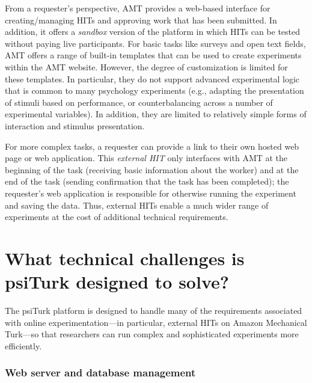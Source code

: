 \documentclass[twocolumn]{svjour3}          %
\newcommand{\psiturk}[0]{\textsf{psiTurk}}
\begin{document}
From a requester's perspective, AMT provides a web-based interface for creating/managing 
HITs and approving work that has been submitted.  In addition, it offers a \emph{sandbox} version 
of the platform in which HITs can be tested without paying live participants.
For basic tasks like surveys and open text fields, AMT offers a range of built-in templates that 
can be used to create experiments within the AMT website.  However, the degree of customization 
is limited for these templates. In particular, they do not support advanced experimental logic that is 
common to many psychology experiments (e.g., adapting the presentation of stimuli based on 
performance, or counterbalancing across a number of experimental variables).
In addition, they are limited to relatively simple forms of interaction and stimulus presentation.

For more complex tasks, a requester can provide a link to their own hosted web page or
web application. This \emph{external HIT} only interfaces with AMT at the beginning of the task (receiving 
basic information about the worker) and at the end of the task (sending confirmation that the task 
has been completed); the requester's web application is responsible for otherwise running the 
experiment and saving the data.  Thus, external HITs enable a much wider range of experiments at 
the cost of additional technical requirements.



\section{What technical challenges is \psiturk{} designed to solve?}

The \psiturk{} platform is designed to handle many of the requirements associated with online experimentation---in particular, external HITs on Amazon Mechanical Turk---so that researchers can run complex and sophisticated experiments more efficiently.

\subsubsection{Web server and database management}
\label{sec:web-and-database}
\end{document}
